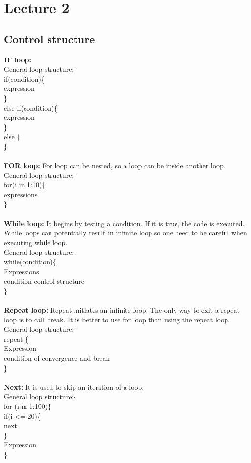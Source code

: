 \documentclass[a4paper,oneside, 12pt]{report}
\begin{document}
\section{Lecture 2}
\subsection{Control structure}
{\bf IF loop:}\\
General loop structure:- \\
if(condition)\{\\
\indent expression\\
\}\\
else if(condition)\{\\
\indent expression\\
\}\\
else \{\\
\}\\
\\
{\bf FOR loop:} For loop can be nested, so a loop can be inside another loop.\\
General loop structure:- \\
for(i in 1:10)\{\\
\indent expressions\\
\}\\
\\
{\bf While loop:} It begins by testing a condition. If it is true, the code is executed. While loops can potentially result in infinite loop so one need to be careful when executing while loop.\\
General loop structure:- \\
while(condition)\{\\
\indent Expressions\\
\indent condition control structure\\
\}\\
\\
{\bf Repeat loop:} Repeat initiates an infinite loop. The only way to exit a repeat loop is to call break. It is better to use for loop than using the repeat loop.\\
General loop structure:- \\
repeat \{\\
\indent Expression\\
\indent condition of convergence and break \\
\}\\
\\
{\bf Next:} It is used to skip an iteration of a loop.\\
General loop structure:- \\
for (i in 1:100)\{\\
\indent if(i <= 20)\{\\
\indent \indent next\\
\indent \}\\
\indent Expression\\
\}\\
\end{document}
